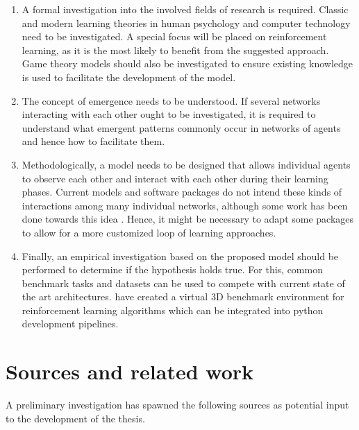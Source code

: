 \documentclass[12pt,a4paper]{article}
\begin{document}
\begin{enumerate}
    \item A formal investigation into the involved fields of research is required. Classic and modern learning theories in human psychology and computer technology need to be investigated. A special focus will be placed on reinforcement learning, as it is the most likely to benefit from the suggested approach. Game theory models should also be investigated to ensure existing knowledge is used to facilitate the development of the model.
    \item The concept of emergence needs to be understood. If several networks interacting with each other ought to be investigated, it is required to understand what emergent patterns commonly occur in networks of agents and hence how to facilitate them.
    \item Methodologically, a model needs to be designed that allows individual agents to observe each other and interact with each other during their learning phases. Current models and software packages do not intend these kinds of interactions among many individual networks, although some work has been done towards this idea \cite{duan2017one}. Hence, it might be necessary to adapt some packages to allow for a more customized loop of learning approaches.
    \item Finally, an empirical investigation based on the proposed model should be performed to determine if the hypothesis holds true. For this, common benchmark tasks and datasets can be used to compete with current state of the art architectures. \citeauthor{openaigym} have created a virtual 3D benchmark environment for reinforcement learning algorithms which can be integrated into python development pipelines.
\end{enumerate}


\section{Sources and related work}
A preliminary investigation has spawned the following sources as potential input to the development of the thesis.
\end{document}
